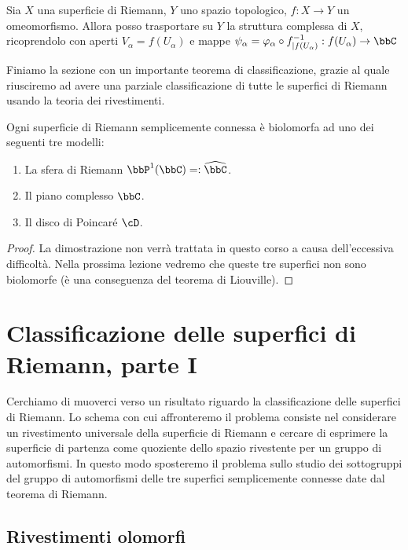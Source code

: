 \begin{osservazione}
Sia $X$ una superficie di Riemann, $Y$ uno spazio topologico, $f:X\rightarrow Y$ un omeomorfismo. Allora posso trasportare su $Y$ la struttura complessa di $X$, ricoprendolo con aperti $V_\alpha=f(U_\alpha)$ e mappe $\psi_\alpha=\varphi_\alpha \circ f^{-1}_{|f(U_\alpha)}:f(U_\alpha)\rightarrow\bbC$
\end{osservazione}

Finiamo la sezione con un importante teorema di classificazione, grazie al quale riusciremo ad avere una parziale classificazione di tutte le superfici di Riemann usando la teoria dei rivestimenti.
\begin{teorema}[di Riemann]\label{teo_riemann}
Ogni superficie di Riemann semplicemente connessa è biolomorfa ad uno dei seguenti tre modelli:
\begin{enumerate}
  \item La sfera di Riemann $\bbP^1(\bbC)=:\widehat{\bbC}$.
  \item Il piano complesso $\bbC$.
  \item Il disco di Poincaré $\cD$.
\end{enumerate}
\end{teorema}
\begin{proof}
La dimostrazione non verrà trattata in questo corso a causa dell'eccessiva difficoltà.
Nella prossima lezione vedremo che queste tre superfici non sono biolomorfe (è una conseguenza del teorema di Liouville).
\end{proof}



\chapter{Classificazione delle superfici di Riemann, parte I}
Cerchiamo di muoverci verso un risultato riguardo la classificazione delle superfici di Riemann. Lo schema con cui affronteremo il problema consiste nel considerare un rivestimento universale della superficie di Riemann e cercare di esprimere la superficie di partenza come quoziente dello spazio rivestente per un gruppo di automorfismi. In questo modo sposteremo il problema sullo studio dei sottogruppi del gruppo di automorfismi delle tre superfici semplicemente connesse date dal teorema di Riemann.

\section{Rivestimenti olomorfi}


